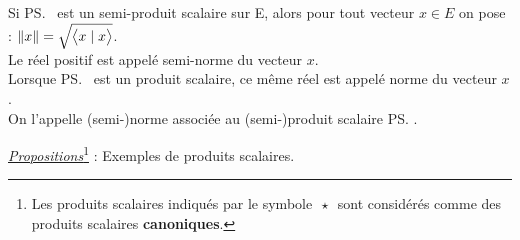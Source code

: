 \vspace{0.5cm}

\noindent Si \ps\, est un semi-produit scalaire sur E, alors pour tout vecteur \(x\in E\) on pose : \(\left\lVert x\right\rVert=\sqrt{\bigl\langle x\mid x \bigr\rangle} \).\\
Le réel positif  est appelé semi-norme du vecteur $x$.\\
Lorsque \ps \ est un produit scalaire, ce même réel est appelé norme du vecteur $x$.\\
On l'appelle (semi-)norme associée au (semi-)produit scalaire \ps.

\vspace{1cm}

\noindent \underline{\emph{Propositions}}\footnote{Les produits scalaires indiqués par le symbole \(\,\star\,\) sont considérés comme des produits scalaires \textbf{canoniques}.} : Exemples de produits scalaires.\vspace{-0.4cm}
